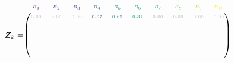 \[
\design_k = \tiny\begin{blockarray}{cccccccccc}
\color[HTML]{440154}B_{1} & \color[HTML]{482878}B_{2} & \color[HTML]{3E4A89}B_{3} & \color[HTML]{31688E}B_{4} & \color[HTML]{26828E}B_{5} & \color[HTML]{1F9E89}B_{6} & \color[HTML]{35B779}B_{7} & \color[HTML]{6DCD59}B_{8} & \color[HTML]{B4DE2C}B_{9} & \color[HTML]{FDE725}B_{10} \\
\begin{block}{(cccccccccc)}
\phantom{x}\\
\color{lightgray}0.00 & \color{lightgray}0.00 & \color{lightgray}0.00 & \color[HTML]{31688E}0.07 & \color[HTML]{26828E}0.62 & \color[HTML]{1F9E89}0.31 & \color{lightgray}0.00 & \color{lightgray}0.00 & \color{lightgray}0.00 & \color{lightgray}0.00\color{black}\\
\color{white}0.00 & \color{white}0.20 & \color{white}0.66 & \color{white}0.14 & \color{white}0.00 & \color{white}0.00 & \color{white}0.00 & \color{white}0.00 & \color{white}0.00 & \color{white}0.00\color{black}\\
  \color{white}0.00 & \color{white}0.00 & \color{white}0.00 & \color{white}0.00 & \color{white}0.00 & \color{white}0.00 & \color{white}0.00 & \color{white}0.17 & \color{white}0.67 & \color{white}0.17\color{black}\\
  \color{white}\vdots & \color{white}\vdots & \color{white}\vdots & \color{white}\vdots & \color{white}\vdots & \color{white}\vdots & \color{white}\vdots & \color{white}\vdots & \color{white}\vdots & \color{white}\vdots\\
  \color{white}0.00 & \color{white}0.02 & \color{white}0.48 & \color{white}0.48 & \color{white}0.02 & \color{white}0.00 & \color{white}0.00 & \color{white}0.00 & \color{white}0.00 & \color{white}0.00\color{black}\\
  \color{white}0.00 & \color{white}0.00 & \color{white}0.00 & \color{white}0.01 & \color{white}0.40 & \color{white}0.55 & \color{white}0.04 & \color{white}0.00 & \color{white}0.00 & \color{white}0.00\color{black}\\
  \color{white}0.00 & \color{white}0.00 & \color{white}0.00 & \color{white}0.00 & \color{white}0.00 & \color{white}0.29 & \color{white}0.63 & \color{white}0.08 & \color{white}0.00 & \color{white}0.00\color{black}\\
\phantom{x}\\
\end{block}
\end{blockarray}
\]
\normalsize
